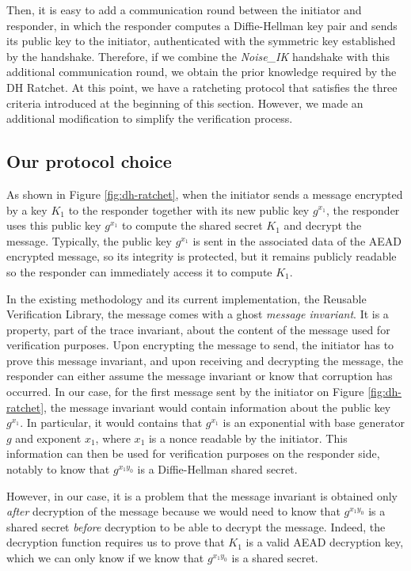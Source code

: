 Then, it is easy to add a communication round between the initiator and responder, in which the responder computes a Diffie-Hellman key pair and sends its public key to the initiator, authenticated with the symmetric key established by the handshake.
Therefore, if we combine the \emph{Noise\_IK} handshake with this additional communication round, we obtain the prior knowledge required by the DH Ratchet.
At this point, we have a ratcheting protocol that satisfies the three criteria introduced at the beginning of this section. However, we made an additional modification to simplify the verification process.

\subsection{Our protocol choice}

As shown in Figure \ref{fig:dh-ratchet}, when the initiator sends a message encrypted by a key $K_1$ to the responder together with its new public key $g^{x_1}$, the responder uses this public key $g^{x_1}$ to compute the shared secret $K_1$ and decrypt the message.
Typically, the public key $g^{x_1}$ is sent in the associated data of the AEAD encrypted message, so its integrity is protected, but it remains publicly readable so the responder can immediately access it to compute $K_1$.

In the existing methodology and its current implementation, the Reusable Verification Library, the message comes with a ghost \emph{message invariant}. It is a property, part of the trace invariant, about the content of the message used for verification purposes. Upon encrypting the message to send, the initiator has to prove this message invariant, and upon receiving and decrypting the message, the responder can either assume the message invariant or know that corruption has occurred.
In our case, for the first message sent by the initiator on Figure \ref{fig:dh-ratchet}, the message invariant would contain information about the public key $g^{x_1}$. In particular, it would contains that $g^{x_1}$ is an exponential with base generator $g$ and exponent $x_1$, where $x_1$ is a nonce readable by the initiator.
This information can then be used for verification purposes on the responder side, notably to know that $g^{x_1y_0}$ is a Diffie-Hellman shared secret.

However, in our case, it is a problem that the message invariant is obtained only \emph{after} decryption of the message because we would need to know that $g^{x_1y_0}$ is a shared secret \emph{before} decryption to be able to decrypt the message.
Indeed, the decryption function requires us to prove that $K_1$ is a valid AEAD decryption key, which we can only know if we know that $g^{x_1y_0}$ is a shared secret.

